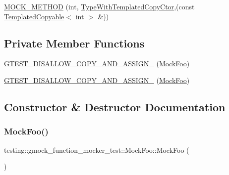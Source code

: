 \begin{DoxyCompactItemize}
\item 
\mbox{\hyperlink{classtesting_1_1gmock__function__mocker__test_1_1_mock_foo_a887e304dcf8658b35634a7a547fad991}{M\+O\+C\+K\+\_\+\+M\+E\+T\+H\+OD}} (int, \mbox{\hyperlink{classtesting_1_1gmock__function__mocker__test_1_1_foo_interface_af9e3190c69647229baed1dba41c2fdf8}{Type\+With\+Templated\+Copy\+Ctor}},(const \mbox{\hyperlink{classtesting_1_1gmock__function__mocker__test_1_1_templated_copyable}{Templated\+Copyable}}$<$ int $>$ \&))
\end{DoxyCompactItemize}
\subsection*{Private Member Functions}
\begin{DoxyCompactItemize}
\item 
\mbox{\hyperlink{classtesting_1_1gmock__function__mocker__test_1_1_mock_foo_af3488cc265e3a6c593fdaeea7ee3a0ee}{G\+T\+E\+S\+T\+\_\+\+D\+I\+S\+A\+L\+L\+O\+W\+\_\+\+C\+O\+P\+Y\+\_\+\+A\+N\+D\+\_\+\+A\+S\+S\+I\+G\+N\+\_\+}} (\mbox{\hyperlink{classtesting_1_1gmock__function__mocker__test_1_1_mock_foo}{Mock\+Foo}})
\item 
\mbox{\hyperlink{classtesting_1_1gmock__function__mocker__test_1_1_mock_foo_af3488cc265e3a6c593fdaeea7ee3a0ee}{G\+T\+E\+S\+T\+\_\+\+D\+I\+S\+A\+L\+L\+O\+W\+\_\+\+C\+O\+P\+Y\+\_\+\+A\+N\+D\+\_\+\+A\+S\+S\+I\+G\+N\+\_\+}} (\mbox{\hyperlink{classtesting_1_1gmock__function__mocker__test_1_1_mock_foo}{Mock\+Foo}})
\end{DoxyCompactItemize}


\subsection{Constructor \& Destructor Documentation}
\mbox{\label{classtesting_1_1gmock__function__mocker__test_1_1_mock_foo_acbbfc5fb080409c8925bc8be2fa6fec4}} 
\subsubsection{\texorpdfstring{MockFoo()}{MockFoo()}\hspace{0.1cm}{\footnotesize\ttfamily [1/2]}}
{\footnotesize\ttfamily testing\+::gmock\+\_\+function\+\_\+mocker\+\_\+test\+::\+Mock\+Foo\+::\+Mock\+Foo (\begin{DoxyParamCaption}{ }\end{DoxyParamCaption})\hspace{0.3cm}{\ttfamily [inline]}}

